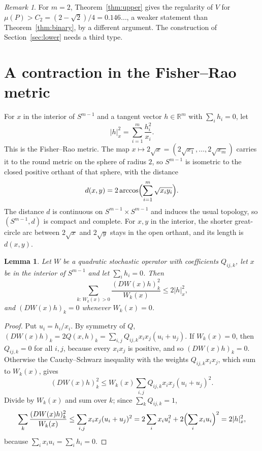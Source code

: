 \documentclass[11pt]{amsart}
\newtheorem{lemma}[theorem]{Lemma}
\theoremstyle{definition}
\theoremstyle{remark}
\newtheorem{remark}[theorem]{Remark}
\newcommand{\R}{\mathbb{R}}
\begin{document}
\begin{remark}\label{rem:binaryupper}
For $m=2$, Theorem~\ref{thm:upper} gives the regularity of $V$ for $\mu(P)>C_2=(2-\sqrt2)/4=0.146\dots$, a weaker
statement than Theorem~\ref{thm:binary}, by a different argument. The construction of Section~\ref{sec:lower} needs a
third type.
\end{remark}

\section{A contraction in the Fisher--Rao metric}\label{sec:upper}

For $x$ in the interior of $S^{m-1}$ and a tangent vector $h\in\R^m$ with $\sum_ih_i=0$, let
\[
|h|_x^2=\sum_{i=1}^m\frac{h_i^2}{x_i}.
\]
This is the Fisher--Rao metric. The map $x\mapsto2\sqrt x=(2\sqrt{x_1},\dots,2\sqrt{x_m})$ carries it to the round metric
on the sphere of radius $2$, so $S^{m-1}$ is isometric to the closed positive orthant of that sphere, with the distance
\begin{equation}\label{eq:dist}
d(x,y)=2\arccos\Bigl(\sum_{i=1}^m\sqrt{x_iy_i}\Bigr).
\end{equation}
The distance $d$ is continuous on $S^{m-1}\times S^{m-1}$ and induces the usual topology, so $(S^{m-1},d)$ is compact
and complete. For $x,y$ in the interior, the shorter great-circle arc between $2\sqrt x$ and $2\sqrt y$ stays in the
open orthant, and its length is $d(x,y)$.

\begin{lemma}\label{lem:fisher}
Let $W$ be a quadratic stochastic operator with coefficients $Q_{ij,k}$, let $x$ be in the interior of $S^{m-1}$ and let
$\sum_ih_i=0$. Then
\[
\sum_{k:\,W_k(x)>0}\frac{(DW(x)h)_k^2}{W_k(x)}\le2|h|_x^2,
\]
and $(DW(x)h)_k=0$ whenever $W_k(x)=0$.
\end{lemma}

\begin{proof}
Put $u_i=h_i/x_i$. By symmetry of $Q$, $(DW(x)h)_k=2Q(x,h)_k=\sum_{i,j}Q_{ij,k}x_ix_j(u_i+u_j)$. If $W_k(x)=0$, then
$Q_{ij,k}=0$ for all $i,j$, because every $x_ix_j$ is positive, and so $(DW(x)h)_k=0$. Otherwise the Cauchy--Schwarz
inequality with the weights $Q_{ij,k}x_ix_j$, which sum to $W_k(x)$, gives
\[
(DW(x)h)_k^2\le W_k(x)\sum_{i,j}Q_{ij,k}x_ix_j(u_i+u_j)^2 .
\]
Divide by $W_k(x)$ and sum over $k$; since $\sum_kQ_{ij,k}=1$,
\[
\sum_k\frac{(DW(x)h)_k^2}{W_k(x)}\le\sum_{i,j}x_ix_j(u_i+u_j)^2=2\sum_ix_iu_i^2+2\Bigl(\sum_ix_iu_i\Bigr)^2=2|h|_x^2,
\]
because $\sum_ix_iu_i=\sum_ih_i=0$.
\end{proof}
\end{document}
